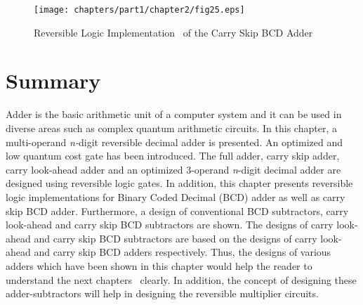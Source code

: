 \begin{figure}[!tbh]
\centering
\texttt{[image: chapters/part1/chapter2/fig25.eps]}
\caption{Reversible Logic Implementation~ of the Carry Skip BCD Adder}
\label{fig:p1_c2_fig25}
\end{figure}
\section{Summary}

Adder is the basic arithmetic unit of a computer system and it can be used in diverse areas such as complex quantum arithmetic circuits. In this chapter, a multi-operand {\it n-}digit reversible decimal adder is presented. An optimized and low quantum cost gate has been introduced. The full adder, carry skip adder, carry look-ahead adder and an optimized 3-operand {\it n}-digit decimal adder are designed using reversible logic gates. In addition, this chapter presents reversible logic implementations for Binary Coded Decimal (BCD) adder as well as carry skip BCD adder. Furthermore, a design of conventional BCD subtractors, carry look-ahead and carry skip BCD subtractors are shown. The designs of carry look-ahead and carry skip BCD subtractors are based on the designs of carry look-ahead and carry skip BCD adders respectively. Thus, the designs of various adders which have been shown in this chapter would help the reader to understand the next chapters~ clearly. In addition, the concept of designing these adder-subtractors will help in designing the reversible multiplier circuits.
